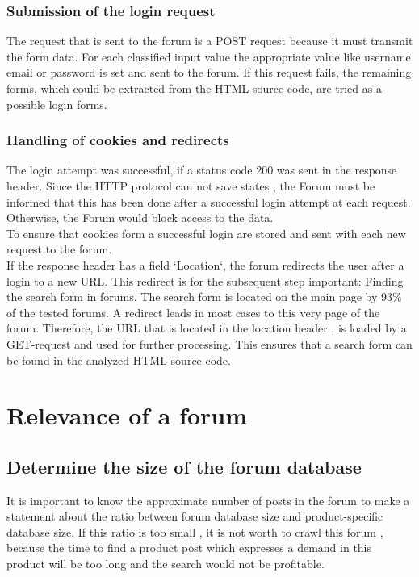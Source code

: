 \subsubsection{Submission of the login request}
The request that is sent to the forum is a POST request because it must transmit the form data. For each classified input value the appropriate value like username email or password is set and sent to the forum. If this request fails, the remaining forms, which could be extracted from the HTML source code, are tried as a possible login forms.

\subsubsection{Handling of cookies and redirects}
The login attempt was successful, if a status code 200 was sent in the response header.
Since the HTTP protocol can not save states , the Forum must be informed that this has been done after a successful login attempt at each request. Otherwise, the Forum would block access to the data. \\
To ensure that cookies form a successful login are stored and sent with each new request to the forum. \\
If the response header has a field `Location`, the forum redirects the user after a login to a new URL. This redirect is for the subsequent step important: Finding the search form in forums. The search form is located on the main page by 93\% of the tested forums. A redirect leads in most cases to this very page of the forum. Therefore, the URL that is located in the location header , is loaded by a GET-request and used for further processing. This ensures that a search form can be found in the analyzed HTML source code.

\section{Relevance of a forum}
\subsection {Determine the size of the forum database}
It is important to know the approximate number of posts in the forum to make a statement about the ratio between forum database size and product-specific database size.
If this ratio is too small , it is not worth to crawl this forum , because the time to find a product post which expresses a demand in this product will be too long and the search would not be profitable.

